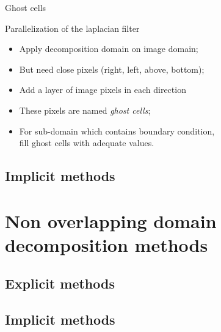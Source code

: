 \documentclass[compress,10pt,aspectratio=169]{beamer}
\begin{document}
\begin{frame}[fragile]{Ghost cells}
  \scriptsize
  \begin{multicols}{2}
  \begin{block}{\small Parallelization of the laplacian filter}
    \begin{itemize}
    \item Apply decomposition domain on image domain;
    \item But need close pixels (right, left, above, bottom);
    \item Add a layer of image pixels in each direction
    \item These pixels are named \textsl{ghost cells};
    \item For sub-domain which contains boundary condition,\\
          fill ghost cells with adequate values.
    \end{itemize}
  \end{block}

  \begin{center}
\end{center}
\end{multicols}
\end{frame}

\subsection{Implicit methods}

\section{Non overlapping domain decomposition methods}

\subsection{Explicit methods}

\subsection{Implicit methods}
\end{document}
